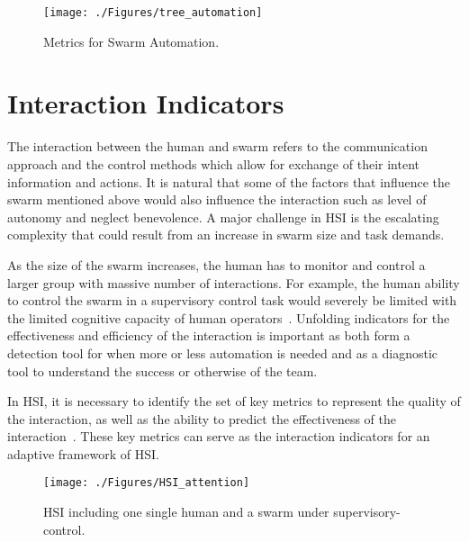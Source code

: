 \documentclass[journal]{IEEEtran}
\begin{document}
\begin{figure*}[tp]
\centering
  \texttt{[image: ./Figures/tree\_automation]}
  \caption{Metrics for Swarm Automation.}
  \label{fig:tree_automation}
\end{figure*}

\section{Interaction Indicators}

The interaction between the human and swarm refers to the communication approach and the control methods which allow for exchange of their intent information and actions. It is natural that some of the factors that influence the swarm mentioned above would also influence the interaction such as level of autonomy and neglect benevolence. A major challenge in HSI is the escalating complexity that could result from an increase in swarm size and task demands.

As the size of the swarm increases, the human has to monitor and control a larger group with massive number of interactions. For example, the human ability to control the swarm in a supervisory control task would severely be limited with the limited cognitive capacity of human operators~\cite{olsen2004fan}. Unfolding indicators for the effectiveness and efficiency of the interaction is important as both form a detection tool for when more or less automation is needed and as a diagnostic tool to understand the success or otherwise of the team.

In HSI, it is necessary to identify the set of key metrics to represent the quality of the interaction, as well as the ability to predict the effectiveness of the interaction~\cite{crandall2007identifying}. These key metrics can serve as the interaction indicators for an adaptive framework of HSI.

\begin{figure*}[tp]
\centering
\texttt{[image: ./Figures/HSI\_attention]}
    \caption{HSI including one single human and a swarm under supervisory-control.}
    \label{fig:interaction_loop}
\end{figure*}
\end{document}
